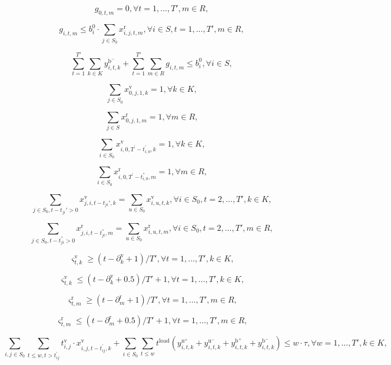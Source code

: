 \documentclass[
  english,
]{article}
\begin{document}
\begin{otherlanguage}{english}
\[\tag{23}g_{0,t,m} = 0,\forall t = 1,...,T',m \in R,\]

\[\tag{24}g_{i,t,m} \leq b_{i}^{0} \cdot \sum\limits_{j \in S_{0}}x_{i,j,t,m}^{\text{r}},\forall i \in S,t = 1,...,T',m \in R,\]

\[\tag{25}\sum\limits_{t = 1}^{T'}{\sum\limits_{k \in K}y_{i,t,k}^{\text{b}^{-}}} + \sum\limits_{t = 1}^{T'}{\sum\limits_{m \in R}g_{i,t,m}} \leq b_{i}^{0},\forall i \in S,\]

\[\tag{26}\sum\limits_{j \in S_{0}}x_{0,j,1,k}^{\text{v}} = 1,\forall k \in K,\]

\[\tag{27}\sum\limits_{j \in S}x_{0,j,1,m}^{\text{r}} = 1,\forall m \in R,\]

\[\tag{28}\sum\limits_{i \in S_{0}}x_{i,0,T^{'} - t_{i,0}^{'},k}^{\text{v}} = 1,\forall k \in K,\]

\[\tag{29}\sum\limits_{i \in S_{0}}x_{i,0,T^{'} - t_{i,0}^{''},m}^{\text{r}} = 1,\forall m \in R,\]

\[\tag{30}\sum\limits_{j \in S_{0},t - t_{\mathit{ji}}' > 0}x_{j,i,t - t_{\mathit{ji}}',k}^{\text{v}} = \sum\limits_{u \in S_{0}}x_{i,u,t,k}^{\text{v}},\forall i \in S_{0},t = 2,...,T',k \in K,\]

\[\tag{31}\sum\limits_{j \in S_{0},t - t_{\mathit{ji}}^{''} > 0}x_{j,i,t - t_{\mathit{ji}}^{''},m}^{\text{r}} = \sum\limits_{u \in S_{0}}x_{i,u,t,m}^{\text{r}},\forall i \in S_{0},t = 2,...,T',m \in R,\]

\[\tag{32}\left. \varsigma_{t,k}^{\text{v}} \geq \left( t - \partial_{k}^{\text{v}} + 1 \right)/T',\forall t = 1,\ldots,T',k \in K, \right.\]

\[\tag{33}\left. \varsigma_{t,k}^{\text{v}} \leq \left( t - \partial_{k}^{\text{v}} + 0.5 \right)/T' + 1,\forall t = 1,\ldots,T',k \in K, \right.\]

\[\tag{34}\left. \varsigma_{t,m}^{\text{r}} \geq \left( t - \partial_{m}^{\text{r}} + 1 \right)/T',\forall t = 1,\ldots,T',m \in R, \right.\]

\[\tag{35}\left. \varsigma_{t,m}^{\text{r}} \leq \left( t - \partial_{m}^{\text{r}} + 0.5 \right)/T' + 1,\forall t = 1,\ldots,T',m \in R, \right.\]

\[\tag{36}\sum\limits_{i,j \in S_{0}}\sum\limits_{t \leq w,t > t_{ij}^{'}}t_{i,j}^{\text{v}} \cdot x_{i,j,t - t_{ij}^{'},k}^{\text{v}} + \sum\limits_{i \in S_{0}}\sum\limits_{t \leq w}t^{\text{load}}\left( {y_{i,t,k}^{\text{u}^{+}} + y_{i,t,k}^{\text{u}^{-}} + y_{i,t,k}^{\text{b}^{+}} + y_{i,t,k}^{\text{b}^{-}}} \right) \leq w \cdot \tau,\forall w = 1,...,T',k \in K,\]


\end{otherlanguage}
\end{document}
